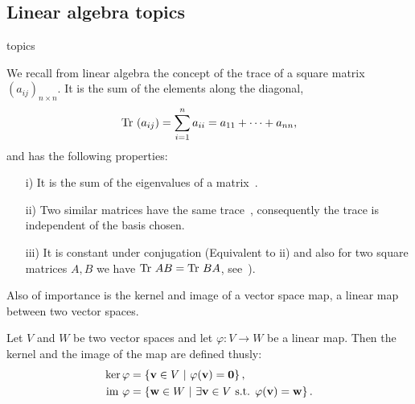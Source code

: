\subsection{Linear algebra topics}
topics
	
		We recall from linear algebra the concept of the trace of a square matrix $(a_{ij})_{n \times n}$. It is the sum of the elements along the diagonal,
		\begin{align*}
			\text{Tr }(a_{ij})= \sum_{i=1}^{n} a_{ii} = a_{11} + \dots + a_{nn},
		\end{align*}
		and has the following properties:
		\begin{proposition}\label{prop:trace}
			\begin{enumerate}
				\item[i)] It is the sum of the eigenvalues of a matrix~\cite[Cor.8.6.1.]{Nicholson}.
				\item[ii)] Two similar matrices have the same trace~\cite[Thm.5.5.1.]{Nicholson}, consequently the trace is independent of the basis chosen.
				\item[iii)] It is constant under conjugation (Equivalent to ii) and also for two square matrices $A,B$ we have $\text{Tr } AB = \text{Tr } BA$, see~\cite[Ex.2.3.30.]{Nicholson}).
			\end{enumerate}
		\end{proposition}


	Also of importance is the kernel and image of a vector space map, a linear map between two vector spaces. %
		
	\begin{definition}\label{def:kernelimage}
		Let $V$ and $W$ be two vector spaces and let $\varphi: V \rightarrow W$ be a linear map. Then the kernel and the image of the map are defined thusly:
		\begin{align*}
			 \ker \varphi &= \left\lbrace \mathbf{v} \in V \ \middle\vert \ \varphi(\mathbf{v}) = \mathbf{0} \right\rbrace, \\  \text{im } \varphi &= \left\lbrace \mathbf{w} \in W \ \middle\vert \ \exists \mathbf{v} \in V \text{ s.t. } \varphi(\mathbf{v}) = \mathbf{w} \right\rbrace.
		\end{align*}
	\end{definition}
	
